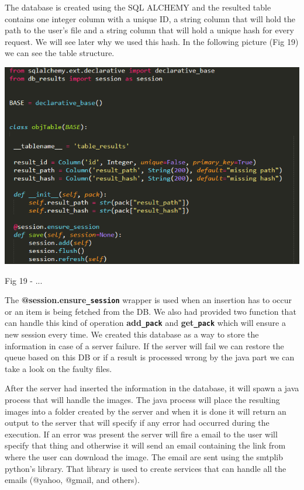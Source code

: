 \documentclass[12pt, a4paper]{report}
\begin{document}
The database is created using the SQL ALCHEMY and the resulted table contains one integer column with a unique ID, a string column that will hold the path to the user's file and a string column that will hold a unique hash for every request. We will see later why we used this hash. In the following picture (Fig 19) we can see the table structure.

\medskip
\includegraphics[scale=0.8, center]{database_table.png}
\begin{center}
Fig 19 - ... 
\end{center}
\par 

The \textbf{@session.ensure\texttt{\_session}} wrapper is used when an insertion has to occur or an item is being fetched from the DB. We also had provided two function that can handle this kind of operation \textbf{add\texttt{\_pack}} and \textbf{get\texttt{\_pack}} which will ensure a new session every time. We created this database as a way to store the information in case of a server failure. If the server will fail we can restore the queue based on this DB or if a result is processed wrong by the java part we can take a look on the faulty files.
\par 

After the server had inserted the information in the database, it will spawn a java process that will handle the images. The java process will place the resulting images into a folder created by the server and when it is done it will return an output to the server that will specify if any error had occurred during the execution. If an error was present the server will fire a email to the user will specify that thing and otherwise it will send an email containing the link from where the user can download the image. The email are sent using the smtplib python's library. That library is used to create services that can handle all the emails (@yahoo, @gmail, and others).
\par 
\end{document}
